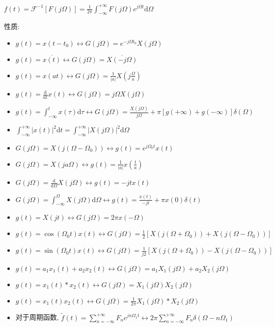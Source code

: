 \documentclass[UTF8, 12pt]{ctexart}
\begin{document}
		$ f(t) = \mathscr{F}^{-1}[F(j\Omega)] = \frac{1}{2\pi}\int_{-\infty}^{+\infty}F(j\Omega)e^{j\Omega t}\mathrm{d}\Omega $

		性质: 
		\begin{itemize}[leftmargin = 4em]
			\item $ g(t) = x(t-t_{0}) \leftrightarrow G(j\Omega) = e^{-j\Omega t_{0}}X(j\Omega) $
			\item $ g(t) = \overline{x(t)} \leftrightarrow G(j\Omega) = \overline{X(-j\Omega)} $
			\item $ g(t) = x(at) \leftrightarrow G(j\Omega) = \frac{1}{|a|}X(j\frac{\Omega}{a}) $
			\item $ g(t) = \frac{\mathrm{d}}{\mathrm{d}t}x(t) \leftrightarrow G(j\Omega) = j\Omega X(j\Omega) $
			\item $ g(t) = \int_{-\infty}^{t}x(\tau)\mathrm{d}\tau \leftrightarrow G(j\Omega) = \frac{X(j\Omega)}{j\Omega} + \pi [g(+\infty)+g(-\infty)]\delta(\Omega) $
			\item $ \int_{-\infty}^{+\infty}|x(t)|^{2}\mathrm{d}t = \int_{-\infty}^{+\infty}|X(j\Omega)|^{2}\mathrm{d}\Omega $
			\item $ G(j\Omega) = X(j(\Omega-\Omega_{0})) \leftrightarrow g(t) = e^{j\Omega_{0}t}x(t) $
			\item $ G(j\Omega) = X(ja\Omega) \leftrightarrow g(t) = \frac{1}{|a|}x(\frac{t}{a}) $
			\item $ G(j\Omega) = \frac{\mathrm{d}}{\mathrm{d}\Omega}X(j\Omega) \leftrightarrow g(t) = -jtx(t) $
			\item $ G(j\Omega) = \int_{-\infty}^{\Omega}X(j\Omega)\mathrm{d}\Omega \leftrightarrow g(t) = \frac{x(t)}{-jt} + \pi x(0)\delta(t) $
			\item $ g(t) = X(jt) \leftrightarrow G(j\Omega) = 2\pi x(-\Omega) $ 
			\item $ g(t) = \cos(\Omega_{0}t)x(t) \leftrightarrow G(j\Omega) = \frac{1}{2}[X(j(\Omega+\Omega_{0}))+X(j(\Omega-\Omega_{0}))] $
			\item $ g(t) = \sin(\Omega_{0}t)x(t) \leftrightarrow G(j\Omega) = \frac{1}{j2}[X(j(\Omega+\Omega_{0}))-X(j(\Omega-\Omega_{0}))] $
			\item $ g(t) = a_{1}x_{1}(t)+a_{2}x_{2}(t) \leftrightarrow G(j\Omega) = a_{1}X_{1}(j\Omega)+a_{2}X_{2}(j\Omega) $
			\item $ g(t) = x_{1}(t)*x_{2}(t) \leftrightarrow G(j\Omega) = X_{1}(j\Omega)X_{2}(j\Omega) $
			\item $ g(t) = x_{1}(t)x_{2}(t) \leftrightarrow G(j\Omega) = \frac{1}{2\pi}X_{1}(j\Omega)*X_{2}(j\Omega) $
			\item 对于周期函数, $ \tilde{f}(t) = \sum\limits_{n=-\infty}^{+\infty}F_{n}e^{jn\Omega_{1}t} \leftrightarrow 2\pi\sum\limits_{n=-\infty}^{+\infty}F_{n}\delta(\Omega-n\Omega_{1}) $
		\end{itemize}
		
\end{document}
